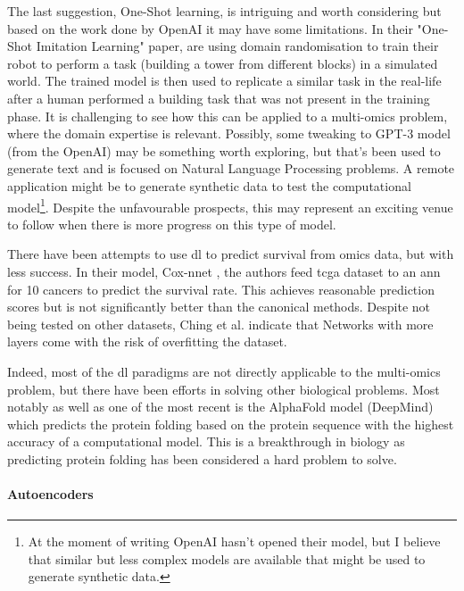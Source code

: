 The last suggestion, One-Shot learning, is intriguing and worth considering but based on the work done by OpenAI it may have some limitations. In their "One-Shot Imitation Learning" paper, \citet{duan2017-ae} are using domain randomisation to train their robot to perform a task (building a tower from different blocks) in a simulated world. The trained model is then used to replicate a similar task in the real-life after a human performed a building task that was not present in the training phase. It is challenging to see how this can be applied to a multi-omics problem, where the domain expertise is relevant. Possibly, some tweaking to GPT-3\cite{Brown2020-wh} model (from the OpenAI) may be something worth exploring, but that's been used to generate text and is focused on Natural Language Processing problems. A remote application might be to generate synthetic data to test the computational model\footnote{At the moment of writing OpenAI hasn't opened their model, but I believe that similar but less complex models are available that might be used to generate synthetic data.}. Despite the unfavourable prospects, this may represent an exciting venue to follow when there is more progress on this type of model.

There have been attempts to use \acrshort{dl} to predict survival from omics data, but with less success. In their model, Cox-nnet \cite{Ching2018-gq}, the authors feed \acrshort{tcga} dataset to an \acrshort{ann} for 10 cancers to predict the survival rate. This achieves reasonable prediction scores but is not significantly better than the canonical methods. Despite not being tested on other datasets, Ching et al. indicate that Networks with more layers come with the risk of overfitting the dataset.  


Indeed, most of the \acrshort{dl} paradigms are not directly applicable to the multi-omics problem, but there have been efforts in solving other biological problems. Most notably as well as one of the most recent is the AlphaFold model\cite{Jumper2021-du} (DeepMind) which predicts the protein folding based on the protein sequence with the highest accuracy of a computational model. This is a breakthrough in biology as predicting protein folding has been considered a hard problem to solve.


\paragraph*{Autoencoders} \label{s:lit:autoencoders}

